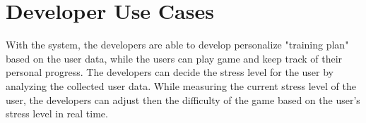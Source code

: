 \begin{table}[!ht]
\centering
\caption{Track Personal Progress Use Case}
\label{table:track-progress}
\vspace{5mm}
\end{table}

\clearpage

\section{Developer Use Cases}

With the system, the developers are able to develop personalize "training plan" based on the user data, while the users can play game and keep track of their personal progress. The developers can decide the stress level for the user by analyzing the collected user data. While measuring the current stress level of the user, the developers can adjust then the difficulty of the game based on the user's stress level in real time.


\begin{table}[!ht]
\centering
\caption{Collect User Data Use Case}
\label{table:collect-data}
\vspace{5mm}
\end{table}

